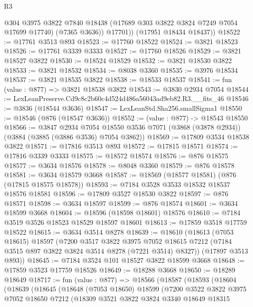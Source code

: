 \begin{lexlean}{R3}
\begin{coremodule}
            @304
            @3975
            @3822
            @7840
            @18438
            (@17689 @303 @3822 @3824 @7249 @7054 @17699 @17740)
            (@7365 @3636))
          @17701))
      (@17951 @18434 @18437))
@18522 := @17761 @3513 @893
@18523 := @17760 @18522
@18524 := @3821 @18523
@18526 := @17761 @3339 @3333
@18527 := @17760 @18526
@18529 := @3821 @18527 @3822
@18530 := @18524 @18529
@18532 := @3821 @18530 @3822
@18533 := @3821 @18532
@18534 := @8038 @3360
@18535 := @3976 @18534
@18537 := @3821 @18535 @3822
@18538 := @18533 @18537
@18541 := fun (value : @877) => @3821 @18538 @3822
@18543 := @3830 @2934 @7054
@18544 := LexLeanPreserve.Cd9c8c2b60c4d524d486a56043ad9eb82.R3.__fits_46
@18546 := @3836 (@18544 @3636)
@18547 := LexLeanStd.Sha256.smallSigma1
@18550 := @18546 (@876 (@18547 @3636))
@18552 := (value : @877) -> @18543 @18550
@18566 := @3847
    @2934
    @7054
    @18550
    @3536
    @7071
    (@3868 (@3878 @2934))
    (@3884 (@3885 (@3886 @3536) @7054 @3862))
@18569 := @17809 @3534 @18538 @3822
@18571 := @17816 @3513 @893
@18572 := @17815 @18571
@18574 := @17816 @3339 @3333
@18575 := @18572 @18574
@18576 := @876 @18575
@18577 := @3634 @18576
@18578 := @8048 @3360
@18579 := @876 @18578
@18581 := @3634 @18579 @3668
@18587 := @18569 (@18577 @18581) (@876 (@17815 @18575 @18578))
@18593 := @7184 @3528 @3533 @18532 @18537 @18576 @18581
@18596 := @17809 @3527 @18530 @3822
@18597 := @876 @18571
@18598 := @3634 @18597
@18599 := @876 @18574
@18601 := @3634 @18599 @3668
@18604 := @18596 (@18598 @18601) @18576
@18610 := @7184 @3519 @3526 @18523 @18529 @18597 @18601
@18613 := @17859 @3518 @17759 @18522
@18615 := @3634 @3514 @8278
@18639 := @18610
    (@18613
      (@7053 @18615)
      @18597
      (@7200
        @3517
        @3822
        @3975
        @7052
        @18615
        @7212
        (@7184 @3515 @897 @3822 @3824 @3514 @8278 (@7221 @3514) @8327))
      (@17897 @3513 @893))
@18645 := @7184 @3524 @101 @18527 @3822 @18599 @3668
@18648 := @17859 @3523 @17759 @18526
@18649 := @18288 @3668
@18650 := @18289 @18649
@18717 := fun (value : @877) =>
  @18566
    (@18587
      (@18593
        (@18604
          (@18639
            (@18645
              (@18648
                (@7053 @18650)
                @18599
                (@7200
                  @3522
                  @3822
                  @3975
                  @7052
                  @18650
                  @7212
                  (@18309
                    @3521
                    @3822
                    @3824
                    @3340
                    @18649
                    @18315

\end{coremodule}
\end{lexlean}
